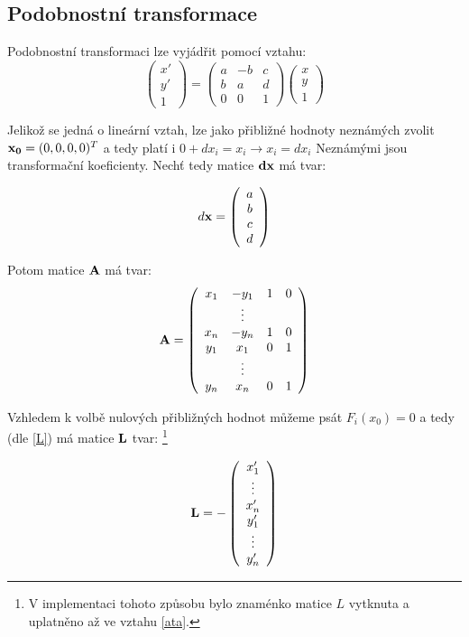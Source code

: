 \subsection{Podobnostní transformace}
\label{vyrpod}
Podobnostní transformaci lze vyjádřit pomocí vztahu:
$$
\left(
\begin{array}{c}
x'\\
y'\\ 
1
\end{array}
\right) 
= 
\left(
\begin{array}{ccc}
a & -b & c\\
b &  a & d\\ 
0 & 0 & 1
\end{array}
\right) 
\left(
\begin{array}{c}
x\\
y\\ 
1
\end{array}
\right) 
$$

Jelikož se jedná o lineární vztah, lze jako přibližné hodnoty neznámých zvolit
$ {\bf x_0} =(0,0,0,0)^T$  a tedy platí i 
$0 + dx_i = x_i \rightarrow x_i = dx_i $
Neznámými jsou transformační koeficienty. Nechť tedy matice 
${\bf dx}$ má tvar: 

$$ d{\bf x} =
\left(
\begin{array}{c}
a\\
b\\
c\\
d
\end{array}
\right) $$

Potom matice ${\bf A}$ má tvar:
$$ 
{\bf A}=
\left(
\begin{array}{cccc}
x_{1} & -y_{1} & 1 & 0\\
& \vdots  &  & \\
x_{n} & -y_{n} & 1 & 0\\
y_{1} &  x_{1} & 0 & 1\\
& \vdots  &  & \\
y_{n} &  x_{n} & 0 & 1\\
\end{array}
\right)
$$


Vzhledem k volbě nulových přibližných hodnot můžeme psát $F_i(x_0) = 0$ a tedy
(dle \ref{L}) má matice ${\bf L}$ tvar:
\footnote[1]{
V implementaci tohoto způsobu bylo znaménko matice $L$ vytknuta a uplatněno až
ve vztahu \ref{ata}.}

\begin{eqnarray}\label{podl}
{\bf L} = -\left(
\begin{array}{c}
x'_{1}\\
\vdots \\
x'_{n}\\
y'_{1}\\ 
\vdots \\
y'_{n}
\end{array}
\right) 
\end{eqnarray}


